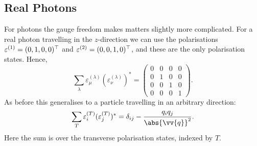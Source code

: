 \subsection{Real Photons}
For photons the gauge freedom makes matters slightly more complicated.
For a real photon travelling in the \(z\)-direction we can use the polarisations \(\varepsilon^{(1)} = (0, 1, 0, 0)^\top\) and \(\varepsilon^{(2)} = (0, 0, 1, 0)^\top\), and these are the only polarisation states.
Hence,
\begin{equation}
    \sum_\lambda \varepsilon_\mu^{(\lambda)}(\varepsilon_\nu^{(\lambda)})^* = 
    \begin{pmatrix}
        0 & 0 & 0 & 0\\
        0 & 1 & 0 & 0\\
        0 & 0 & 1 & 0\\
        0 & 0 & 0 & 1
    \end{pmatrix}
    .
\end{equation}
As before this generalises to a particle travelling in an arbitrary direction:
\begin{equation}
    \sum_T \varepsilon_i^{(T)}(\varepsilon_j^{(T)})^* = \delta_{ij} - \frac{q_iq_j}{\abs{\vv{q}}^2}.
\end{equation}
Here the sum is over the transverse polarisation states, indexed by \(T\).

